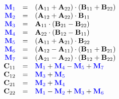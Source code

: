     \vspace{-50pt}
    \begin{multicols}{2}
        \begin{equation*}
            \begin{array}{rcl}
                \color{blue} \mathbf{M}_1 & = & (\mathbf{A}_{11} + \mathbf{A}_{22})\cdot (\mathbf{B}_{11} + \mathbf{B}_{22}) \\
                \color{blue} \mathbf{M}_2 & = & (\mathbf{A}_{12} + \mathbf{A}_{22})\cdot \mathbf{B}_{11} \\
                \color{blue} \mathbf{M}_3 & = & \mathbf{A}_{11}\cdot (\mathbf{B}_{21} - \mathbf{B}_{22}) \\
                \color{blue} \mathbf{M}_4 & = & \mathbf{A}_{22}\cdot (\mathbf{B}_{12} - \mathbf{B}_{11}) \\
                \color{blue} \mathbf{M}_5 & = & (\mathbf{A}_{11} + \mathbf{A}_{21})\cdot \mathbf{B}_{22} \\
                \color{blue} \mathbf{M}_6 & = & (\mathbf{A}_{12} - \mathbf{A}_{11})\cdot (\mathbf{B}_{11} + \mathbf{B}_{21}) \\
                \color{blue} \mathbf{M}_7 & = & (\mathbf{A}_{21} - \mathbf{A}_{22})\cdot (\mathbf{B}_{12} + \mathbf{B}_{22}) \\
                \mathbf{C}_{11} & = & \color{blue} \mathbf{M}_1 \color{black} + \color{blue} \mathbf{M}_4 \color{black} - \color{blue} \mathbf{M}_5 \color{black} + \color{blue} \mathbf{M}_7 \\
                \mathbf{C}_{12} & = & \color{blue} \mathbf{M}_3 \color{black} + \color{blue} \mathbf{M}_5 \\
                \mathbf{C}_{21} & = & \color{blue} \mathbf{M}_2 \color{black} + \color{blue} \mathbf{M}_4 \\
                \mathbf{C}_{22} & = & \color{blue} \mathbf{M}_1 \color{black} - \color{blue} \mathbf{M}_2 \color{black} + \color{blue} \mathbf{M}_3 \color{black} + \color{blue} \mathbf{M}_6
            \end{array}
        \end{equation*}

        \columnbreak


\end{multicols}
